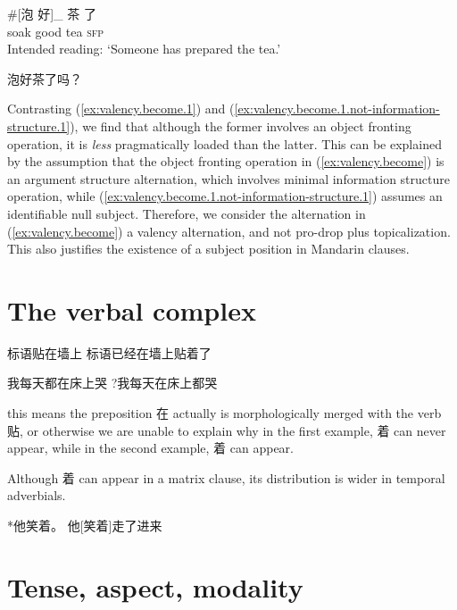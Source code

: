 \documentclass[UTF8, a4paper, oneside, scheme=plain, 12pt]{ctexrep}
\newcommand{\translate}[1]{`#1'}
\newcommand*{\category}[1]{\textsc{#1}}
\begin{document}
\begin{exe}
    \ex \begin{xlist}
        \ex\label{ex:valency.become.1.not-information-structure.1}
        \gll \#[泡 好]_{} 茶 了 \\
        soak good tea \category{sfp} \\
        \glt Intended reading: \translate{Someone has prepared the tea.}
    
        \ex\label{ex:valency.become.1.not-information-structure.2} 泡好茶了吗？
    \end{xlist}
\end{exe}

Contrasting (\ref{ex:valency.become.1})
and (\ref{ex:valency.become.1.not-information-structure.1}),
we find that although the former involves an object fronting operation,
it is \emph{less} pragmatically loaded than the latter.
This can be explained by the assumption that 
the object fronting operation in (\ref{ex:valency.become})
is an argument structure alternation,
which involves minimal information structure operation,
while (\ref{ex:valency.become.1.not-information-structure.1})
assumes an identifiable null subject.
Therefore, we consider the alternation in (\ref{ex:valency.become})
a valency alternation, and not pro-drop plus topicalization.
This also justifies the existence of a subject position in Mandarin clauses.

\chapter{The verbal complex}

\begin{exe}
    \ex 标语贴在墙上 
    \ex 标语已经在墙上贴着了
\end{exe}

\begin{exe}
    \ex 我每天都在床上哭
    \ex ?我每天在床上都哭
\end{exe}
 
this means the preposition 在 actually is morphologically merged with the verb 贴, 
or otherwise we are unable to explain why 
in the first example, 着 can never appear, 
while in the second example, 着 can appear.

Although 着 can appear in a matrix clause, 
its distribution is wider in temporal adverbials. 

*他笑着。
他[笑着]走了进来

\chapter{Tense, aspect, modality}
\end{document}

